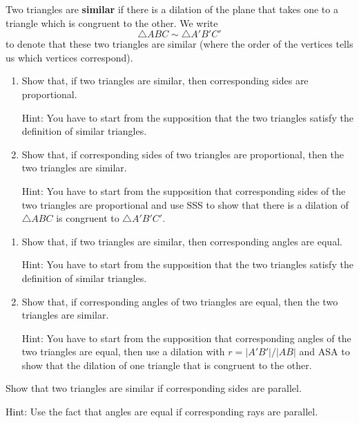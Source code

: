 \documentclass{ximera}
\begin{document}
\begin{definition}
Two triangles are \textbf{similar} if there is a dilation of the
plane that takes one to a triangle which is congruent to the other. We write%
\[
\triangle ABC\sim\triangle A'B'C'%
\]
to denote that these two triangles are similar (where the order of the
vertices tells us which vertices correspond).
\end{definition}

\begin{question}
\begin{enumerate}
\item Show that, if two triangles are similar, then corresponding
sides are proportional.

Hint: You have to start from the supposition that the two triangles satisfy
the definition of similar triangles.

\item Show that, if corresponding sides of two triangles are proportional, then
the two triangles are similar.

Hint: You have to start from the supposition that corresponding sides of the
two triangles are proportional and use SSS to show that there is a dilation of
$\triangle ABC$ is congruent to $\triangle A'B'C'$.
\end{enumerate}
\end{question}

\begin{question}
\begin{enumerate}
\item Show that, if two triangles are similar, then corresponding
angles are equal.

Hint: You have to start from the supposition that the two triangles satisfy
the definition of similar triangles.

\item Show that, if corresponding angles of two triangles are equal, then the two
triangles are similar.

Hint: You have to start from the supposition that corresponding angles of the
two triangles are equal, then use a dilation with $r=|A'B'|/|AB|$ and ASA to show that the dilation of one triangle that is congruent
to the other.
\end{enumerate}
\end{question}

\begin{question}
\label{39} Show that two triangles are similar if corresponding
sides are parallel.

Hint: Use the fact that angles are equal if corresponding rays are
parallel.
\end{question}
\end{document}
